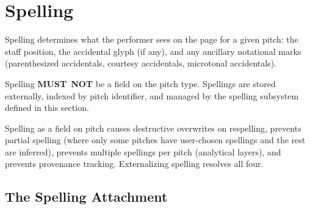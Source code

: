 \documentclass[11pt,letterpaper]{report}
\newcommand{\MUSTNOT}{\textbf{MUST}\nobreak\ \textbf{NOT}}
\begin{document}
\section{Spelling}
\label{sec:pitch:spelling}

Spelling determines what the performer sees on the page for a given
pitch: the staff position, the accidental glyph (if any), and any
ancillary notational marks (parenthesized accidentals, courtesy
accidentals, microtonal accidentals).

Spelling \MUSTNOT{} be a field on the pitch type. Spellings are stored
externally, indexed by pitch identifier, and managed by the spelling
subsystem defined in this section.

\begin{rationale}
  Spelling as a field on pitch causes destructive overwrites on
  respelling, prevents partial spelling (where only some pitches have
  user-chosen spellings and the rest are inferred), prevents multiple
  spellings per pitch (analytical layers), and prevents provenance
  tracking. Externalizing spelling resolves all four.
\end{rationale}

\subsection{The Spelling Attachment}
\end{document}
